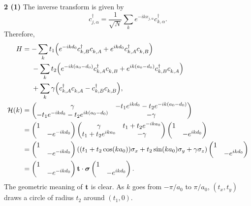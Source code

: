 \documentclass{article}
\makeatletter
\newcommand*{\shifttext}[1]{%
  \settowidth{\@tempdima}{#1}%
  \hspace{-\@tempdima}#1%
}
\newcommand{\plabel}[1]{%
\shifttext{\textbf{#1}\quad}%
}
\newcommand{\prule}{%
\begin{center}%
\hdashrule[0.5ex]{.99\linewidth}{1pt}{1pt 2.5pt}%
\end{center}%
}
\makeatother
\begin{document}
\prule

\plabel{2 (1)}%
The inverse transform is given by
\[ c^\dagger_{j,\alpha} = \frac{1}{\sqrt{N}} \sum_k e^{-i k x_{j,\alpha}} c^\dagger_{k,\alpha}. \]
Therefore,
\begin{align*}
  H &= -\sum_k t_1 \qty(e^{-i k d_0} c^\dagger_{k,B} c^{\vphantom{\dagger}}_{k,A} + e^{i k d_0} c^\dagger_{k,A} c^{\vphantom{\dagger}}_{k,B}) \\
  &\phantom{{}={}} - \sum_k t_2 \qty(e^{-i k (a_0 - d_0)} c^\dagger_{k,A} c^{\vphantom{\dagger}}_{k,B} + e^{i k (a_0 - d_0)} c^\dagger_{k,B} c^{\vphantom{\dagger}}_{k,A}) \\
  &\phantom{{}={}} + \sum_k \gamma\qty(c^\dagger_{k,A} c^{\vphantom{\dagger}}_{k,A} - c^\dagger_{k,B} c^{\vphantom{\dagger}}_{k,B}), \\
  \mathcal{H}(k) &= \begin{pmatrix}
    \gamma & -t_1 e^{i k d_0} - t_2 e^{-i k (a_0 - d_0)} \\
    -t_1 e^{-i k d_0} - t_2 e^{i k (a_0 - d_0)} & -\gamma
  \end{pmatrix} \\
  &= \begin{pmatrix}
    1 & \\ & -e^{-i k d_0}
  \end{pmatrix} \begin{pmatrix}
    \gamma & t_1 + t_2 e^{-i k a_0} \\
    t_1 + t_2 e^{i k a_0} & -\gamma
  \end{pmatrix} \begin{pmatrix}
    1 & \\ & -e^{i k d_0}
  \end{pmatrix} \\
  &= \begin{pmatrix}
    1 & \\ & -e^{-i k d_0}
  \end{pmatrix} \qty((t_1 + t_2 \cos(k a_0))\sigma_x + t_2 \sin(k a_0) \sigma_y + \gamma \sigma_z) \begin{pmatrix}
    1 & \\ & -e^{i k d_0}
  \end{pmatrix} \\
  &= \begin{pmatrix}
    1 & \\ & -e^{-i k d_0}
  \end{pmatrix} \vb{t}\cdot \vb*{\sigma} \begin{pmatrix}
    1 & \\ & -e^{i k d_0}
  \end{pmatrix}.
\end{align*}
The geometric meaning of $\vb{t}$ is clear.
As $k$ goes from $-\pi/a_0$ to $\pi/a_0$, $(t_x,t_y)$ draws a circle of radius $t_2$ around $(t_1,0)$.
\end{document}
